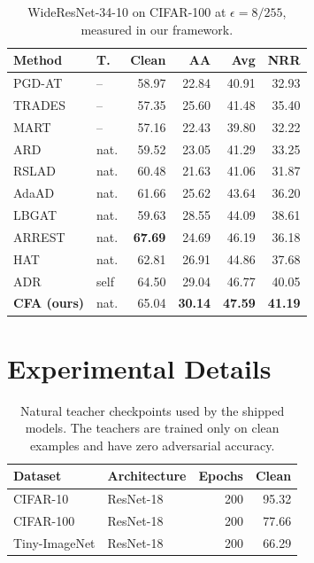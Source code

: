 \begin{table}[!htbp]
  \centering \small \setlength{\tabcolsep}{5pt}
  \caption{WideResNet-34-10 on CIFAR-100 at $\epsilon=8/255$, measured in our framework.}
  \label{tab:wrn100}
  \begin{tabular}{llrrrr}
    \toprule
    Method & T. & Clean & AA & Avg & NRR \\
    \midrule
    PGD-AT & -- & 58.97 & 22.84 & 40.91 & 32.93 \\
    TRADES & -- & 57.35 & 25.60 & 41.48 & 35.40 \\
    MART & -- & 57.16 & 22.43 & 39.80 & 32.22 \\
    \midrule
    ARD & nat. & 59.52 & 23.05 & 41.29 & 33.25 \\
    RSLAD & nat. & 60.48 & 21.63 & 41.06 & 31.87 \\
    AdaAD & nat. & 61.66 & 25.62 & 43.64 & 36.20 \\
    LBGAT & nat. & 59.63 & 28.55 & 44.09 & 38.61 \\
    ARREST & nat. & \textbf{67.69} & 24.69 & 46.19 & 36.18 \\
    HAT & nat. & 62.81 & 26.91 & 44.86 & 37.68 \\
    ADR & self & 64.50 & 29.04 & 46.77 & 40.05 \\
    \midrule
    \textbf{CFA (ours)} & nat. & 65.04 & \textbf{30.14} & \textbf{47.59} & \textbf{41.19} \\
    \bottomrule
  \end{tabular}
\end{table}

\section{Experimental Details}
\label{app:repro}

\begin{table}[!htbp]
  \centering \small \setlength{\tabcolsep}{5pt}
  \caption{Natural teacher checkpoints used by the shipped models. The teachers are trained only on
  clean examples and have zero adversarial accuracy.}
  \label{tab:teachers}
  \begin{tabular}{llrr}
    \toprule
    Dataset & Architecture & Epochs & Clean \\
    \midrule
    CIFAR-10      & ResNet-18 & 200 & 95.32 \\
    CIFAR-100     & ResNet-18 & 200 & 77.66 \\
    Tiny-ImageNet & ResNet-18 & 200 & 66.29 \\
    \bottomrule
  \end{tabular}
\end{table}

